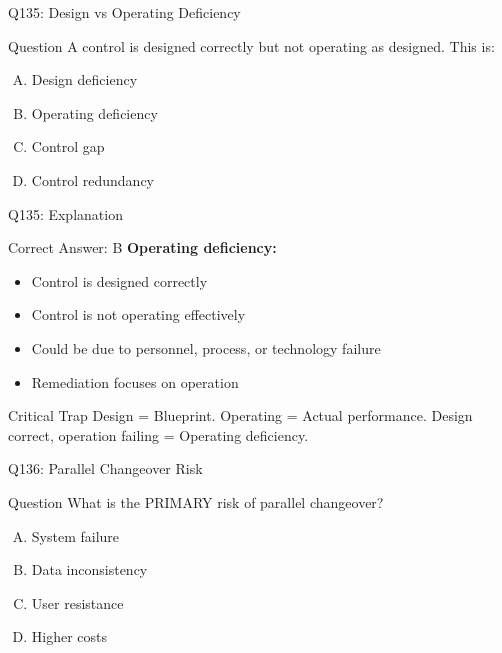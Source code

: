 \documentclass{beamer}
\begin{document}
	\begin{frame}{Q135: Design vs Operating Deficiency}
		\begin{block}{Question}
			A control is designed correctly but not operating as designed. This is:
		\end{block}
		\begin{enumerate}[(A)]
			\item Design deficiency
			\item Operating deficiency
			\item Control gap
			\item Control redundancy
		\end{enumerate}
	\end{frame}
	
	\begin{frame}{Q135: Explanation}
		\begin{block}{Correct Answer: B}
			\textbf{Operating deficiency:}
			\begin{itemize}
				\item Control is designed correctly
				\item Control is not operating effectively
				\item Could be due to personnel, process, or technology failure
				\item Remediation focuses on operation
			\end{itemize}
		\end{block}
		\begin{alertblock}{Critical Trap}
			Design = Blueprint.
			Operating = Actual performance.
			Design correct, operation failing = Operating deficiency.
		\end{alertblock}
	\end{frame}
	
	\begin{frame}{Q136: Parallel Changeover Risk}
		\begin{block}{Question}
			What is the PRIMARY risk of parallel changeover?
		\end{block}
		\begin{enumerate}[(A)]
			\item System failure
			\item Data inconsistency
			\item User resistance
			\item Higher costs
		\end{enumerate}
	\end{frame}
	
\end{document}
